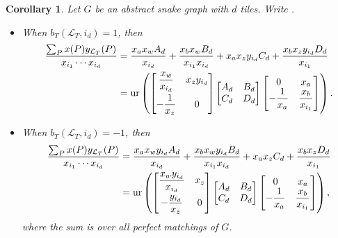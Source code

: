 \documentclass[10pt,a4paper]{amsart}
\numberwithin{equation}{section}
\newtheorem{Corollary}[Theorem]{Corollary}
\theoremstyle{definition}
\begin{document}
\begin{Corollary}
Let $G$ be an abstract snake graph with $d$ tiles. Write .
\begin{itemize}\itemsep=0pt
\item When $b_{T}(\mathcal{L}_{T}, i_{d})=1$, then
\begin{align*}
\frac{\sum_P x(P)y_{\mathcal{L}_T}(P)}{x_{i_1}\cdots x_{i_d}}&=\frac{x_a x_w A_d}{x_{i_d}}+\frac{x_b x_w B_d}{x_{i_1} x_{i_d}}+x_{a} x_z y_{i_d}C_d+\frac{x_b x_z y_{i_d}D_d}{x_{i_1}}\nonumber\\
&=\operatorname{ur}\left(\begin{bmatrix}
\dfrac{x_w}{x_{i_d}} & x_{z}y_{i_d}\vspace{1mm}\\
-\dfrac{1}{x_{z}} & 0
\end{bmatrix}
\begin{bmatrix}
A_d & B_d\\
C_d & D_d
\end{bmatrix}
\begin{bmatrix}
0 &x_a\\
-\dfrac{1}{x_a} & \dfrac{x_b}{x_{i_1}}
\end{bmatrix}\right).%
\end{align*}

\item When $b_{T}(\mathcal{L}_{T}, i_{d})=-1$, then
\begin{align*}
\frac{\sum_P x(P)y_{\mathcal{L}_T}(P)}{x_{i_1}\cdots x_{i_d}}&=\frac{x_a x_w y_{i_d} A_d}{x_{i_d}}+\frac{x_b x_w y_{i_d} B_d}{x_{i_1} x_{i_d}}+x_{a} x_z C_d+\frac{x_b x_z D_d}{x_{i_1}}\\
&=\operatorname{ur}\left(\begin{bmatrix}
\dfrac{x_w y_{i_d}}{x_{i_d}} & x_{z}\vspace{1mm}\\
-\dfrac{y_{i_d}}{x_{z}} & 0
\end{bmatrix}
\begin{bmatrix}
A_d & B_d\\
C_d & D_d
\end{bmatrix}
\begin{bmatrix}
0 & x_a\\
-\dfrac{1}{x_a} & \dfrac{x_b}{x_{i_1}}
\end{bmatrix}\right), %
\end{align*}
where the sum is over all perfect matchings of $G$.
\end{itemize}
\end{Corollary}
\end{document}
